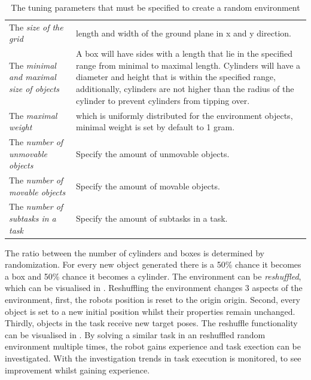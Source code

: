 \noindent
\begin{table}[H]
\centering
\begin{tabular}%
{>{\raggedright\arraybackslash}p{}%
>{\raggedright\arraybackslash}p{}}
The \textit{size of the grid} & length and width of the ground plane in \gls{x} and \gls{y} direction.\\
The \textit{minimal and maximal size of objects} & A box will have sides with a length that lie in the specified range from minimal to maximal length. Cylinders will have a diameter and height that is within the specified range, additionally, cylinders are not higher than the radius of the cylinder to prevent cylinders from tipping over. \\
The \textit{maximal weight} & which is uniformly distributed for the environment objects, minimal weight is set by default to 1 gram. \\
The \textit{number of unmovable objects} & Specify the amount of unmovable objects.\\
The \textit{number of movable objects} & Specify the amount of movable objects.\\
The \textit{number of subtasks in a task} & Specify the amount of subtasks in a task.
\end{tabular}
\caption{The tuning parameters that must be specified to create a random environment}%
\label{table:configure_rand_env}
\end{table}

The ratio between the number of cylinders and boxes is determined by randomization. For every new object generated there is a 50\% chance it becomes a box and 50\% chance it becomes a cylinder. The environment can be \textit{reshuffled}, which can be visualised in . Reshuffling the environment changes 3 aspects of the environment, first, the robots position is reset to the origin \gls{origin}. Second, every object is set to a new initial position whilst their properties remain unchanged. Thirdly, objects in the task receive new target poses.  The reshuffle functionality can be visualised in . By solving a similar task in an reshuffled random environment multiple times, the robot gains experience and task exection can be investigated. With the investigation trends in task execution is monitored, to see improvement whilst gaining experience.\bs

